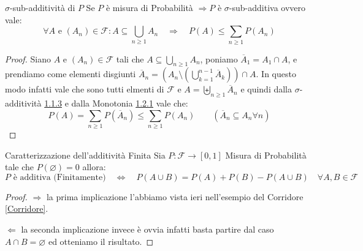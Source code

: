 \documentclass[11pt, a4paper, twoside]{article}
\begin{document}
\begin{prop}{$\sigma$-sub-additività di $P$}{}\label{sub-additività}
	Se $P$ è misura di Probabilità	$\Rightarrow P$ è $\sigma$-sub-additiva ovvero vale:
	\[
		\forall A \text{ e } (A_n)\in\mathcal F : A\subseteq \bigcup\limits_{n\geq 1} A_n\quad\Rightarrow\quad P(A)\leq \sum\limits_{n\geq 1} P(A_n)
	\]
\end{prop}
\begin{proof}
	Siano $A$ e $(A_n)\in\mathcal F$ tali che $A\subseteq \bigcup\limits_{n\geq 1} A_n$, poniamo $\overline{A}_1= A_1\cap A$, e prendiamo come elementi disgiunti $\overline{A}_n=\left(A_n\setminus\left(\bigcup\limits_{k=1}^{n-1} \overline{A}_k\right)\right)\cap A$. In questo modo infatti vale che sono tutti elmenti di $\mathcal F$ e $A=\biguplus\limits_{n\geq1} \overline{A}_n$ e quindi dalla $\sigma$-additività \hyperref[Misura]{1.1.3}  e dalla Monotonia \hyperref[Monotonia]{1.2.1} vale che: %
	\[
		P(A)=\sum\limits_{n\geq 1} P(\overline{A}_n)\leq \sum\limits_{n\geq 1} P(A_n)\qquad \left(\overline{A}_n\subseteq A_n \forall n\right)
	\]
\end{proof}

\begin{prop}{Caratterizzazione dell'additività Finita}{}
	Sia $P : \mathcal F\rightarrow [0,1]$ Misura di Probabilità tale che $P(\varnothing)=0$ allora:
	\[
		P \text{ è additiva (Finitamente)}\quad \iff\quad P(A\cup B)=P(A)+P(B)-P(A\cup B) \quad \forall A,B\in \mathcal F
	\]
\end{prop}
\begin{proof}
	$\Rightarrow $ la prima implicazione l'abbiamo vista ieri nell'esempio del Corridore \ref{Corridore}.

	$\Leftarrow$ la seconda implicazione invece è ovvia infatti basta partire dal caso $A\cap B=\varnothing$ ed otteniamo il risultato.
\end{proof}
\end{document}
